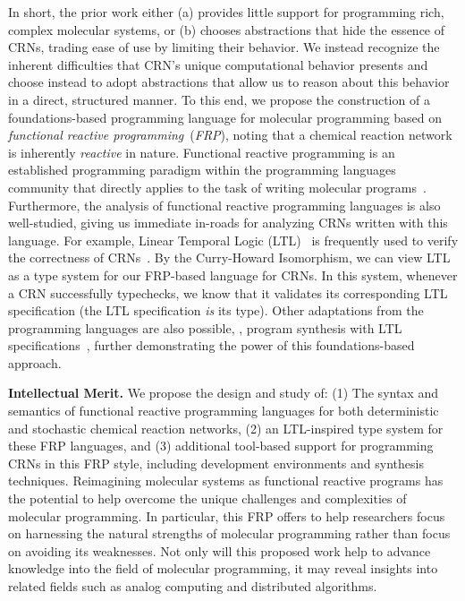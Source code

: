 In short, the prior work either (a) provides little support for programming rich, complex molecular systems, or (b) chooses abstractions that hide the essence of CRNs, trading ease of use by limiting their behavior.
We instead recognize the inherent difficulties that CRN's unique computational behavior presents and choose instead to adopt abstractions that allow us to reason about this behavior in a direct, structured manner.
To this end, we propose the construction of a foundations-based programming language for molecular programming based on \emph{functional reactive programming}~(\emph{FRP}), noting that a chemical reaction network is inherently \emph{reactive} in nature.
Functional reactive programming is an established programming paradigm within the programming languages community that directly applies to the task of writing molecular programs~\cite{elliott1997, czaplicki2013, finkbeiner2019, jeffrey2012}.
Furthermore, the analysis of functional reactive programming languages is also well-studied, giving us immediate in-roads for analyzing CRNs written with this language.
For example, Linear Temporal Logic (LTL)~\cite{pnueli1997,manna2012temporal,oBaiKat08} is frequently used to verify the correctness of CRNs~\cite{jKwiTha14,cEHKLLL14,jEKLLLM17}.
By the Curry-Howard Isomorphism, we can view LTL as a type system for our FRP-based language for CRNs.
In this system, whenever a CRN successfully typechecks, we know that it validates its corresponding LTL specification (the LTL specification \emph{is} its type).
Other adaptations from the programming languages are also possible, \eg, program synthesis with LTL specifications~\cite{finkbeiner2019}, further demonstrating the power of this foundations-based approach.

\textbf{Intellectual Merit.}
We propose the design and study of: (1) The syntax and semantics of functional reactive programming languages for both deterministic and stochastic chemical reaction networks, (2) an LTL-inspired type system for these FRP languages, and (3) additional tool-based support for programming CRNs in this FRP style, including development environments and synthesis techniques.
Reimagining molecular systems as functional reactive programs has the potential to help overcome the unique challenges and complexities of molecular programming.
In particular, this FRP offers to help researchers focus on harnessing the natural strengths of molecular programming rather than focus on avoiding its weaknesses.
Not only will this proposed work help to advance knowledge into the field of molecular programming, it may reveal insights into related fields such as analog computing and distributed algorithms.

